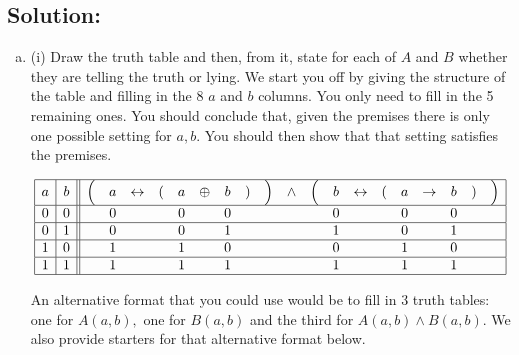 \documentclass[12pt]{article}
\begin{document}
\subsection*{\textbf{Solution:}}
\begin{enumerate}[(a)]
    \item 
    (i) Draw the truth table and then, from it, state for each of $A$ and $B$ whether they are telling the truth or lying.
We start you off by giving the structure of the table and filling in the 8 $a$ and $b$ columns.  You only need to fill in the 5 remaining ones.  You should  conclude that, given the premises there is only one possible setting for $a,b.$  You should then show that that setting satisfies the premises.
 

$$
\begin{array}{|c|c||ccccccccccccccccccc|}\hline
 a & b & \Bigl( & a & \leftrightarrow & ( & a  &\oplus &  b & ) & \Bigr) & \wedge & \Bigl( & b & \leftrightarrow &  ( &a & \rightarrow  & b & ) & \Bigr) \\\hline
 0 & 0 &&0&&& 0 && 0 &&&&& 0 &&& 0 && 0 &&\\\hline
 0 & 1 &&0&&& 0 && 1 &&&&& 1 &&& 0 && 1 &&\\\hline
 1 & 0 &&1&&& 1 && 0 &&&&& 0 &&& 1 && 0 &&\\\hline
 1 & 1 &&1&&& 1 && 1 &&&&& 1 &&& 1 && 1 &&\\\hline
 \end{array}
 $$

\bigskip

 An alternative format that you could use would be to fill in 3 truth tables: one for $A(a,b),$ one for $B(a,b)$ and the third for $A(a,b) \wedge B(a,b).$ We also provide starters for that alternative format below.



\end{enumerate}
\end{document}
